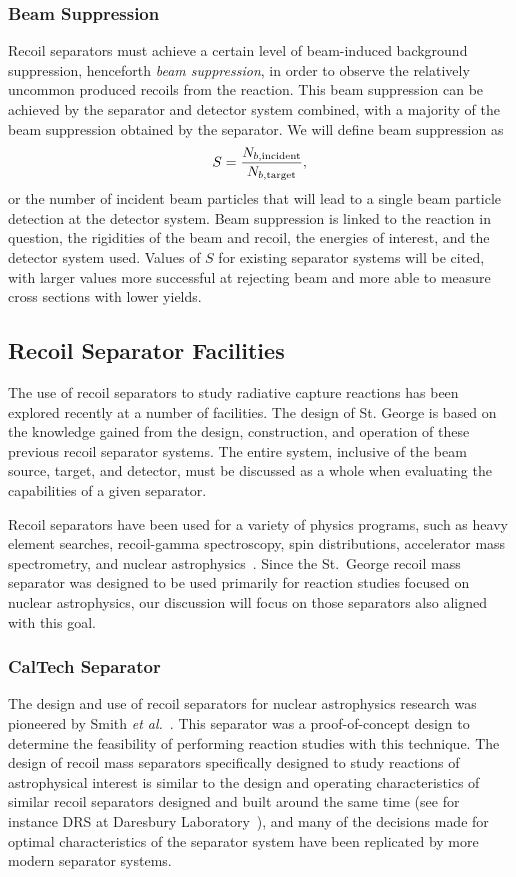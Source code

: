 \subsubsection{Beam Suppression}
Recoil separators must achieve a certain level of beam-induced background
suppression, henceforth \emph{beam suppression}, in order to observe the
relatively uncommon produced recoils from the reaction. This beam suppression
can be achieved by the separator and detector system combined, with a majority
of the beam suppression obtained by the separator. We will define beam
suppression as
\[
    S = \frac{N_{b,\rm{incident}}}{N_{b,\rm{target}}},
\]
or the number of incident beam particles that will lead to a single beam
particle detection at the detector system. Beam suppression is linked to the
reaction in question, the rigidities of the beam and recoil, the energies of
interest, and the detector system used. Values of $S$ for existing separator
systems will be cited, with larger values more successful at rejecting beam and
more able to measure cross sections with lower yields.

\subsection{Recoil Separator Facilities}

The use of recoil separators to study radiative capture reactions has been
explored recently at a number of facilities. The design of St. George is based
on the knowledge gained from the design, construction, and operation of these
previous recoil separator systems. The entire system, inclusive of the beam
source, target, and detector, must be discussed as a whole when evaluating the
capabilities of a given separator.

Recoil separators have been used for a variety of physics programs, such as
heavy element searches, recoil-gamma spectroscopy, spin distributions,
accelerator mass spectrometry, and nuclear astrophysics~\cite{Davids2003}.
Since the St.\ George recoil mass separator was designed to be used primarily
for reaction studies focused on nuclear astrophysics, our discussion will
focus on those separators also aligned with this goal.

\subsubsection{CalTech Separator}
The design and use of recoil separators for nuclear astrophysics research was
pioneered by Smith \textit{et al.}~\cite{Smith1991}. This separator was a
proof-of-concept design to determine the feasibility of performing reaction
studies with this technique. The design of recoil mass separators specifically
designed to study reactions of astrophysical interest is similar to the design
and operating characteristics of similar recoil separators designed and built
around the same time (see for instance DRS at Daresbury
Laboratory~\cite{James1988}), and many of the decisions made for optimal
characteristics of the separator system have been replicated by more modern
separator systems.

